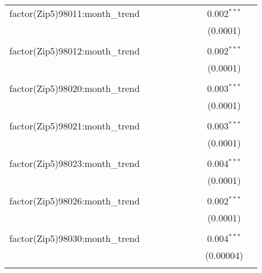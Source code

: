 \begin{table}[H]
{\begin{tabular}{@{\extracolsep{5pt}}lcccccccc}
  factor(Zip5)98011:month\_trend &  &  &  &  &  &  & 0.002$^{***}$ &  \\  

   &  &  &  &  &  &  & (0.0001) &  \\  

   & & & & & & & & \\  

  factor(Zip5)98012:month\_trend &  &  &  &  &  &  & 0.002$^{***}$ &  \\  

   &  &  &  &  &  &  & (0.0001) &  \\  

   & & & & & & & & \\  

  factor(Zip5)98020:month\_trend &  &  &  &  &  &  & 0.003$^{***}$ &  \\  

   &  &  &  &  &  &  & (0.0001) &  \\  

   & & & & & & & & \\  

  factor(Zip5)98021:month\_trend &  &  &  &  &  &  & 0.003$^{***}$ &  \\  

   &  &  &  &  &  &  & (0.0001) &  \\  

   & & & & & & & & \\  

  factor(Zip5)98023:month\_trend &  &  &  &  &  &  & 0.004$^{***}$ &  \\  

   &  &  &  &  &  &  & (0.0001) &  \\  

   & & & & & & & & \\  

  factor(Zip5)98026:month\_trend &  &  &  &  &  &  & 0.002$^{***}$ &  \\  

   &  &  &  &  &  &  & (0.0001) &  \\  

   & & & & & & & & \\  

  factor(Zip5)98030:month\_trend &  &  &  &  &  &  & 0.004$^{***}$ &  \\  

   &  &  &  &  &  &  & (0.00004) &  \\  

   & & & & & & & & \\  


\end{tabular}}
\end{table}
